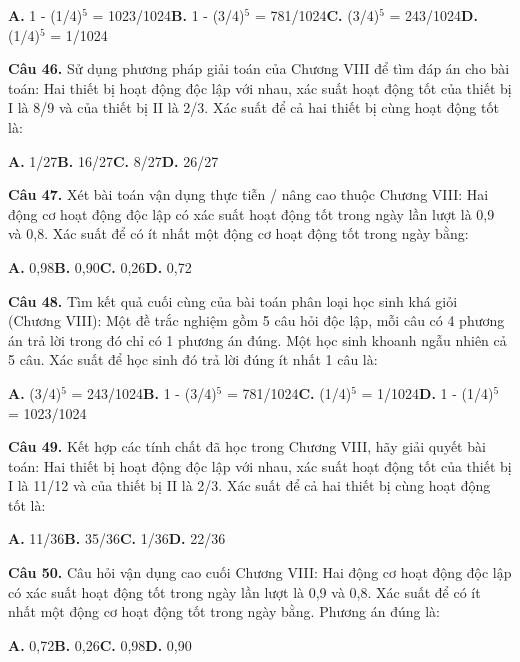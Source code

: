 \documentclass[11pt,a4paper]{article}
\begin{document}
\hspace*{1.5em}\textbf{A.} 1 - (1/4)$^5$ = 1023/1024\quad\quad \textbf{B.} 1 - (3/4)$^5$ = 781/1024\quad\quad \textbf{C.} (3/4)$^5$ = 243/1024\quad\quad \textbf{D.} (1/4)$^5$ = 1/1024\par\vspace{2pt}
\textbf{\color{primary} Câu 46.} Sử dụng phương pháp giải toán của Chương VIII để tìm đáp án cho bài toán: Hai thiết bị hoạt động độc lập với nhau, xác suất hoạt động tốt của thiết bị I là 8/9 và của thiết bị II là 2/3. Xác suất để cả hai thiết bị cùng hoạt động tốt là:\par
\hspace*{1.5em}\textbf{A.} 1/27\quad\quad \textbf{B.} 16/27\quad\quad \textbf{C.} 8/27\quad\quad \textbf{D.} 26/27\par\vspace{2pt}
\textbf{\color{primary} Câu 47.} Xét bài toán vận dụng thực tiễn / nâng cao thuộc Chương VIII: Hai động cơ hoạt động độc lập có xác suất hoạt động tốt trong ngày lần lượt là 0,9 và 0,8. Xác suất để có ít nhất một động cơ hoạt động tốt trong ngày bằng:\par
\hspace*{1.5em}\textbf{A.} 0,98\quad\quad \textbf{B.} 0,90\quad\quad \textbf{C.} 0,26\quad\quad \textbf{D.} 0,72\par\vspace{2pt}
\textbf{\color{primary} Câu 48.} Tìm kết quả cuối cùng của bài toán phân loại học sinh khá giỏi (Chương VIII): Một đề trắc nghiệm gồm 5 câu hỏi độc lập, mỗi câu có 4 phương án trả lời trong đó chỉ có 1 phương án đúng. Một học sinh khoanh ngẫu nhiên cả 5 câu. Xác suất để học sinh đó trả lời đúng ít nhất 1 câu là:\par
\hspace*{1.5em}\textbf{A.} (3/4)$^5$ = 243/1024\quad\quad \textbf{B.} 1 - (3/4)$^5$ = 781/1024\quad\quad \textbf{C.} (1/4)$^5$ = 1/1024\quad\quad \textbf{D.} 1 - (1/4)$^5$ = 1023/1024\par\vspace{2pt}
\textbf{\color{primary} Câu 49.} Kết hợp các tính chất đã học trong Chương VIII, hãy giải quyết bài toán: Hai thiết bị hoạt động độc lập với nhau, xác suất hoạt động tốt của thiết bị I là 11/12 và của thiết bị II là 2/3. Xác suất để cả hai thiết bị cùng hoạt động tốt là:\par
\hspace*{1.5em}\textbf{A.} 11/36\quad\quad \textbf{B.} 35/36\quad\quad \textbf{C.} 1/36\quad\quad \textbf{D.} 22/36\par\vspace{2pt}
\textbf{\color{primary} Câu 50.} Câu hỏi vận dụng cao cuối Chương VIII: Hai động cơ hoạt động độc lập có xác suất hoạt động tốt trong ngày lần lượt là 0,9 và 0,8. Xác suất để có ít nhất một động cơ hoạt động tốt trong ngày bằng. Phương án đúng là:\par
\hspace*{1.5em}\textbf{A.} 0,72\quad\quad \textbf{B.} 0,26\quad\quad \textbf{C.} 0,98\quad\quad \textbf{D.} 0,90\par\vspace{2pt}
\end{document}
